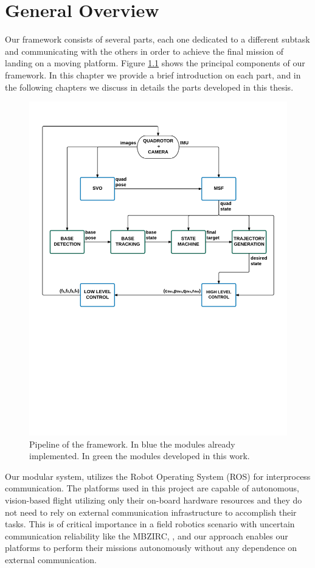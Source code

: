 \chapter{General Overview}\label{chap:general_framework}
Our framework consists of several parts, each one dedicated to a different subtask and communicating with the others in order to achieve the final mission of landing on a moving platform. Figure \ref{fig:pipeline_diagram} shows the principal components of our framework. In this chapter we provide a brief introduction on each part, and in the following chapters we  discuss in details the parts developed in this thesis.
\begin{figure}[!ht]
    \centering
    \includegraphics[width=1.0\textwidth]{img/pipeline_diagram.pdf}
    \caption{Pipeline of the framework. In blue the modules already implemented. In green the modules developed in this work.}
    \label{fig:pipeline_diagram}
\end{figure}

Our modular system, utilizes the Robot Operating System (ROS) \cite{ros} for interprocess communication. The platforms used in this project are capable of autonomous, vision-based flight utilizing only their on-board hardware resources and they do not need to rely on external communication infrastructure to accomplish their tasks. This is of critical importance in a field robotics scenario with uncertain communication reliability like the MBZIRC, , and our approach enables our platforms to perform their missions
autonomously without any dependence on external communication.

